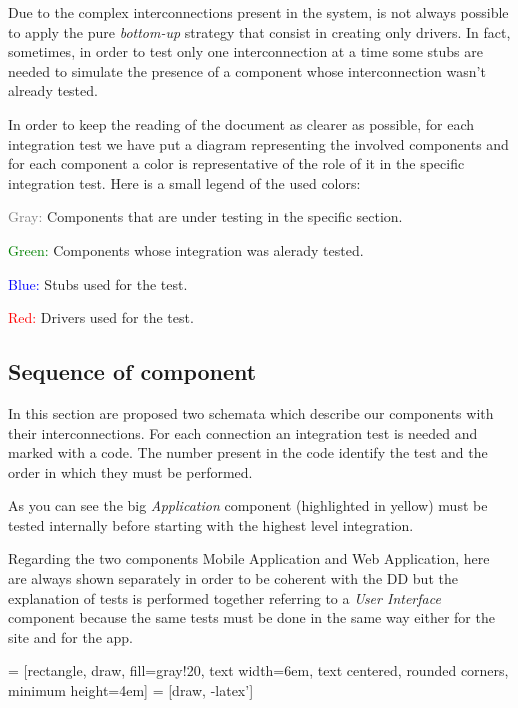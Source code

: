 \documentclass[a4paper]{article}
\begin{document}
Due to the complex interconnections present in the system, is not always possible to apply the pure \textit{bottom-up} strategy that consist in creating only drivers. In fact, sometimes, in order to test only one interconnection at a time some stubs are needed to simulate the presence of a component whose interconnection wasn't already tested.

In order to keep the reading of the document as clearer as possible, for each integration test we have put a diagram representing the involved components and for each component a color is representative of the role of it in the specific integration test. Here is a small legend of the used colors:
\begin{itemize*}
    \item[\textcolor{gray}{Gray:}] Components that are under testing in the specific section.
    \item[\textcolor{green}{Green:}] Components whose integration was alerady tested.
    \item[\textcolor{blue}{Blue:}] Stubs used for the test.
    \item[\textcolor{red}{Red:}] Drivers used for the test.
\end{itemize*}

\subsection{Sequence of component}

In this section are proposed two schemata which describe our components with their interconnections. For each connection an integration test is needed and marked with a code. The number present in the code identify the test and the order in which they must be performed.

As you can see the big \emph{Application} component (highlighted in yellow) must be tested internally before starting with the highest level integration.

Regarding the two components Mobile Application and Web Application, here are always shown separately in order to be coherent with the DD but the explanation of tests is performed together referring to a \textit{User Interface} component because the same tests must be done in the same way either for the site and for the app.

 = [rectangle, draw, fill=gray!20, 
    text width=6em, text centered, rounded corners, minimum height=4em]
 = [draw, -latex']
\end{document}
